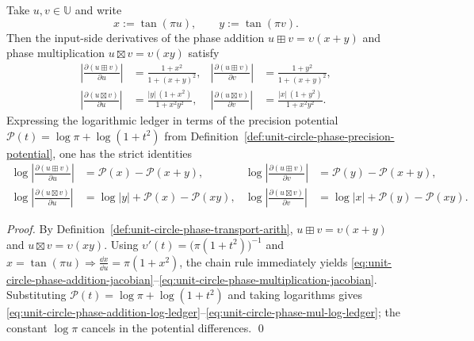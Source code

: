 \begin{proposition}\label{prop:unit-circle-phase-log-condition-numbers}
Take \(u,v\in\mathbb{U}\) and write
\[
x:=\tan(\pi u),\qquad y:=\tan(\pi v).
\]
Then the input-side derivatives of the phase addition \(u\boxplus v=\upsilon(x+y)\) and phase multiplication \(u\boxtimes v=\upsilon(xy)\) satisfy
\begin{align}
\left|\frac{\partial(u\boxplus v)}{\partial u}\right|
&=\frac{1+x^2}{1+(x+y)^2},
&
\left|\frac{\partial(u\boxplus v)}{\partial v}\right|
&=\frac{1+y^2}{1+(x+y)^2},\label{eq:unit-circle-phase-addition-jacobian}\\[4pt]
\left|\frac{\partial(u\boxtimes v)}{\partial u}\right|
&=\frac{|y|\,(1+x^2)}{1+x^2y^2},
&
\left|\frac{\partial(u\boxtimes v)}{\partial v}\right|
&=\frac{|x|\,(1+y^2)}{1+x^2y^2}.\label{eq:unit-circle-phase-multiplication-jacobian}
\end{align}
Expressing the logarithmic ledger in terms of the precision potential \(\mathcal{P}(t)=\log\pi+\log(1+t^2)\) from Definition~\ref{def:unit-circle-phase-precision-potential}, one has the strict identities
\begin{align}
\log\left|\frac{\partial(u\boxplus v)}{\partial u}\right|
&=\mathcal{P}(x)-\mathcal{P}(x+y),
&
\log\left|\frac{\partial(u\boxplus v)}{\partial v}\right|
&=\mathcal{P}(y)-\mathcal{P}(x+y),\label{eq:unit-circle-phase-addition-log-ledger}\\[4pt]
\log\left|\frac{\partial(u\boxtimes v)}{\partial u}\right|
&=\log|y|+\mathcal{P}(x)-\mathcal{P}(xy),
&
\log\left|\frac{\partial(u\boxtimes v)}{\partial v}\right|
&=\log|x|+\mathcal{P}(y)-\mathcal{P}(xy).\label{eq:unit-circle-phase-mul-log-ledger}
\end{align}
\end{proposition}
\begin{proof}
By Definition~\ref{def:unit-circle-phase-transport-arith},
\(
u\boxplus v=\upsilon(x+y)
\)
and
\(
u\boxtimes v=\upsilon(xy)
\).
Using \(\upsilon'(t)=\bigl(\pi(1+t^2)\bigr)^{-1}\) and \(x=\tan(\pi u)\Rightarrow \frac{\dd x}{\dd u}=\pi(1+x^2)\), the chain rule immediately yields \eqref{eq:unit-circle-phase-addition-jacobian}--\eqref{eq:unit-circle-phase-multiplication-jacobian}.
Substituting \(\mathcal{P}(t)=\log\pi+\log(1+t^2)\) and taking logarithms gives \eqref{eq:unit-circle-phase-addition-log-ledger}--\eqref{eq:unit-circle-phase-mul-log-ledger}; the constant \(\log\pi\) cancels in the potential differences. \qed
\end{proof}
